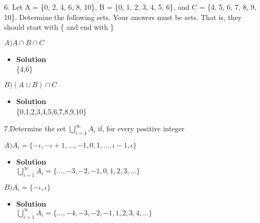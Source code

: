 \documentclass[11pt]{article}
\begin{document}
\begin{enumerate}

\begin{flushleft}
{\large 6. Let A = \{0, 2, 4, 6, 8, 10\}, B = \{0, 1, 2, 3, 4, 5, 6\}, and C = \{4, 5, 6, 7, 8, 9, 10\}. Determine the following sets. Your answers must be sets. That is, they should start with \{ and end with \}}
\end{flushleft}



 \emph{$A) A \cap B \cap C$}\\
 \begin{itemize}
\item \textbf{Solution}\\
\large \{4,6\}\\
\end {itemize}

 \emph{$B) (A \cup B)\cap C$}\\
 \begin{itemize}
\item \textbf{Solution}\\
\large \{0,1,2,3,4,5,6,7,8,9,10\}\\



\end {itemize}
\end {enumerate}

\begin{enumerate}

\begin{flushleft}
{\large 7.Determine the set  $\bigcup\limits_{i=1}^{\infty} A_{i}$ if, for every positive integer \iota }
\end{flushleft}



 \emph{$A) A_{i} = \{ - \iota, - \iota +1, ..., -1,0,1,...,\iota -1, \iota\}$}\\
 \begin{itemize}
\item \textbf{Solution}\\
\large $\bigcup\limits_{i=1}^{\infty} A_{i} = \{..., -3,-2,-1,0,1,2,3,...\}$\\
\end {itemize}


 \emph{$B) A_{i} = \{ - \iota, \iota\}$}\\
 \begin{itemize}
\item \textbf{Solution}\\
\large $\bigcup\limits_{i=1}^{\infty} A_{i} = \{..., -4,-3,-2,-1,1,2,3,4,...\}$\\


\end {itemize}
\end {enumerate}
\end{document}
